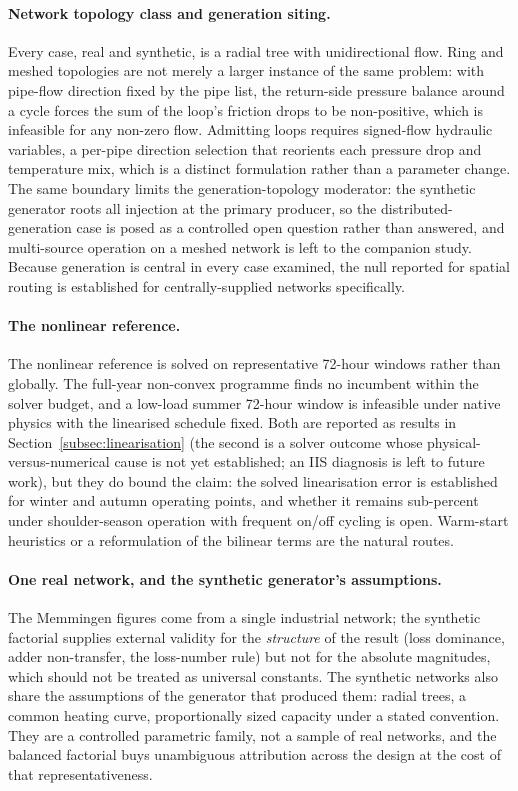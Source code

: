 \paragraph{Network topology class and generation siting.}
Every case, real and synthetic, is a radial tree with unidirectional flow. Ring and meshed
topologies are not merely a larger instance of the same problem: with pipe-flow direction
fixed by the pipe list, the return-side pressure balance around a cycle forces the sum of
the loop's friction drops to be non-positive, which is infeasible for any non-zero flow.
Admitting loops requires signed-flow hydraulic variables, a per-pipe direction selection
that reorients each pressure drop and temperature mix, which is a distinct formulation
rather than a parameter change. The same boundary limits the generation-topology
moderator: the synthetic generator roots all injection at the primary producer, so the
distributed-generation case is posed as a controlled open question rather than answered,
and multi-source operation on a meshed network is left to the companion study. Because
generation is central in every case examined, the null reported for spatial routing is
established for centrally-supplied networks specifically.

\paragraph{The nonlinear reference.}
The nonlinear reference is solved on representative 72-hour windows rather than globally. The
full-year non-convex programme finds no incumbent within the solver budget, and a low-load
summer 72-hour window is infeasible under native physics with the linearised schedule fixed. Both
are reported as results in Section~\ref{subsec:linearisation} (the second is a solver outcome
whose physical-versus-numerical cause is not yet established; an IIS diagnosis is left to future
work), but they do bound the claim: the solved linearisation error is established for winter
and autumn operating points, and whether it remains sub-percent under shoulder-season
operation with frequent on/off cycling is open. Warm-start heuristics or a reformulation
of the bilinear terms are the natural routes.

\paragraph{One real network, and the synthetic generator's assumptions.}
The Memmingen figures come from a single industrial network; the synthetic factorial
supplies external validity for the \emph{structure} of the result (loss dominance,
adder non-transfer, the loss-number rule) but not for the absolute magnitudes, which
should not be treated as universal constants. The synthetic networks also share the
assumptions of the generator that produced them: radial trees, a common heating curve,
proportionally sized capacity under a stated convention. They are a controlled parametric
family, not a sample of real networks, and the balanced factorial buys unambiguous
attribution across the design at the cost of that representativeness.

